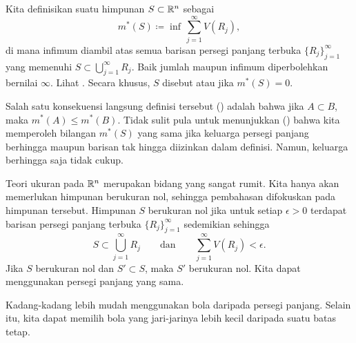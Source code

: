 \begin{defn}
Kita definisikan \emph{} suatu himpunan
$S \subset {\mathbb{R}}^n$ sebagai
\begin{equation*}
m^*(S)
\coloneqq
\inf\,
\sum_{j=1}^\infty V(R_j) ,
\end{equation*}
di mana infimum diambil atas semua barisan persegi panjang terbuka
$\{ R_j \}_{j=1}^\infty$ yang memenuhi
$S \subset \bigcup_{j=1}^\infty R_j$. Baik jumlah maupun infimum diperbolehkan
bernilai $\infty$. Lihat .
Secara khusus, $S$ disebut \emph{} atau
\emph{} jika $m^*(S) = 0$.
\end{defn}

\begin{myfigureht}
\caption{Konstruksi ukuran luar; dalam kasus ini $S \subset R_1 \cup R_2
\cup R_3 \cup \cdots$, sehingga $m^*(S) \leq V(R_1) + V(R_2)+V(R_3) +
\cdots$.\label{fig:outermeasure}}
\end{myfigureht}

Salah satu konsekuensi langsung definisi tersebut
() adalah bahwa jika $A \subset B$,
maka $m^*(A) \leq m^*(B)$. Tidak sulit pula untuk menunjukkan
() bahwa kita memperoleh
bilangan $m^*(S)$ yang sama jika keluarga persegi panjang berhingga maupun
barisan tak hingga diizinkan dalam definisi. Namun, keluarga berhingga saja
tidak cukup.

Teori ukuran pada ${\mathbb{R}}^n$ merupakan bidang yang sangat rumit. Kita hanya akan
memerlukan himpunan berukuran nol, sehingga pembahasan difokuskan pada himpunan
tersebut. Himpunan $S$ berukuran nol jika untuk setiap $\epsilon > 0$ terdapat
barisan persegi panjang terbuka $\{ R_j \}_{j=1}^\infty$ sedemikian sehingga
\begin{equation} \label{mv:eq:nullR}
S \subset \bigcup_{j=1}^\infty R_j \qquad \text{dan} \qquad
\sum_{j=1}^\infty V(R_j) < \epsilon.
\end{equation}
Jika $S$ berukuran nol dan $S' \subset S$, maka $S'$ berukuran nol. Kita dapat
menggunakan persegi panjang yang sama.

\pagebreak[2]
Kadang-kadang lebih mudah menggunakan bola daripada persegi panjang. Selain
itu, kita dapat memilih bola yang jari-jarinya lebih kecil daripada suatu batas
tetap.

